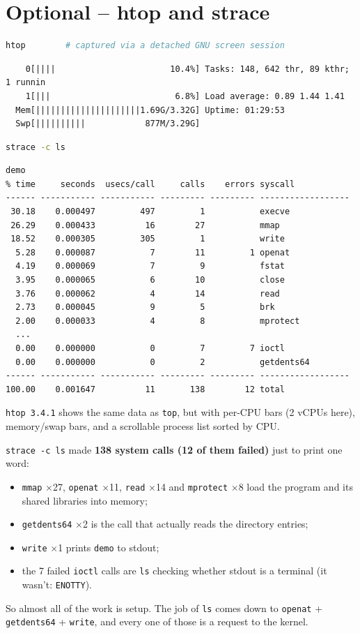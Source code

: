 \documentclass[12pt]{article}
\begin{document}
\section*{Optional -- htop and strace}
\begin{lstlisting}[language=bash]
htop        # captured via a detached GNU screen session
\end{lstlisting}
\begin{lstlisting}
    0[||||                       10.4%] Tasks: 148, 642 thr, 89 kthr; 1 runnin
    1[|||                         6.8%] Load average: 0.89 1.44 1.41
  Mem[|||||||||||||||||||||1.69G/3.32G] Uptime: 01:29:53
  Swp[||||||||||            877M/3.29G]
\end{lstlisting}

\begin{lstlisting}[language=bash]
strace -c ls
\end{lstlisting}
\begin{lstlisting}
demo
% time     seconds  usecs/call     calls    errors syscall
------ ----------- ----------- --------- --------- ------------------
 30.18    0.000497         497         1           execve
 26.29    0.000433          16        27           mmap
 18.52    0.000305         305         1           write
  5.28    0.000087           7        11         1 openat
  4.19    0.000069           7         9           fstat
  3.95    0.000065           6        10           close
  3.76    0.000062           4        14           read
  2.73    0.000045           9         5           brk
  2.00    0.000033           4         8           mprotect
  ...
  0.00    0.000000           0         7         7 ioctl
  0.00    0.000000           0         2           getdents64
------ ----------- ----------- --------- --------- ------------------
100.00    0.001647          11       138        12 total
\end{lstlisting}

\texttt{htop 3.4.1} shows the same data as \texttt{top}, but with per-CPU bars (2 vCPUs here), memory/swap bars, and a scrollable process list sorted by CPU.

\texttt{strace -c ls} made \textbf{138 system calls (12 of them failed)} just to print one word:
\begin{itemize}
    \item \texttt{mmap} $\times$27, \texttt{openat} $\times$11, \texttt{read} $\times$14 and \texttt{mprotect} $\times$8 load the program and its shared libraries into memory;
    \item \texttt{getdents64} $\times$2 is the call that actually reads the directory entries;
    \item \texttt{write} $\times$1 prints \texttt{demo} to stdout;
    \item the 7 failed \texttt{ioctl} calls are \texttt{ls} checking whether stdout is a terminal (it wasn't: \texttt{ENOTTY}).
\end{itemize}
So almost all of the work is setup. The  job of \texttt{ls} comes down to \texttt{openat} + \texttt{getdents64} + \texttt{write}, and every one of those is a request to the kernel.
\end{document}
